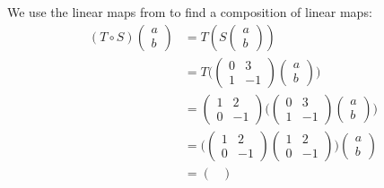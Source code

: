 \begin{exm}\label{exm-linear-composition:1}
	We use the linear maps from  to
	find a composition of linear maps:
	\begin{align*}
		(T \circ S)\begin{pmatrix}
			a \\ b
		\end{pmatrix} & =T\left(S\begin{pmatrix}
			a \\ b
		\end{pmatrix}\right)                          \\
		                                       & =T\Bigg(\begin{pmatrix}
			0 & 3  \\
			1 & -1
		\end{pmatrix}\begin{pmatrix}
			a \\ b
		\end{pmatrix}\Bigg) \\
		                                       & =\begin{pmatrix}
			1 & 2  \\
			0 & -1
		\end{pmatrix}\Bigg(
		\begin{pmatrix}
			0 & 3  \\
			1 & -1
		\end{pmatrix}\begin{pmatrix}
			a \\ b
		\end{pmatrix}
		\Bigg)                                                                                                        \\
		                                       & =\Bigg(
		\begin{pmatrix}
			1 & 2  \\
			0 & -1
		\end{pmatrix}
		\begin{pmatrix}
			1 & 2  \\
			0 & -1
		\end{pmatrix}
		\Bigg)\begin{pmatrix}
			a \\ b
		\end{pmatrix}                                                                             \\
		                                       & = \begin{pmatrix}

\end{pmatrix}
\end{align*}
\end{exm}
